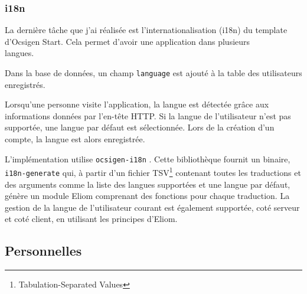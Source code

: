 %
%

\subsubsection*{i18n}

La dernière tâche que j'ai réalisée est l'internationalisation (i18n) du template
d'Ocsigen Start. Cela permet d'avoir une application dans
plusieurs \\ langues.

Dans la base de données, un champ \verb|language| est ajouté à la table des
utilisateurs enregistrés.

Lorsqu'une personne visite l'application, la langue est détectée grâce aux
informations données par l'en-tête HTTP. Si la langue de l'utilisateur n'est pas
supportée, une langue par défaut est sélectionnée. Lors de la création d'un compte, la
langue est alors enregistrée.

L'implémentation utilise \verb|ocsigen-i18n| \cite{ocsigen-i18n}. Cette
bibliothèque fournit un binaire, \verb|i18n-generate| qui, à partir d'un fichier
TSV\footnote{Tabulation-Separated Values} contenant toutes les traductions et
des arguments comme la liste des langues supportées et une langue par défaut,
génère un module Eliom comprenant des fonctions pour chaque traduction. La
gestion de la langue de l'utilisateur courant est également supportée, coté
serveur et coté client, en utilisant les principes d'Eliom.


\subsection{Personnelles}

